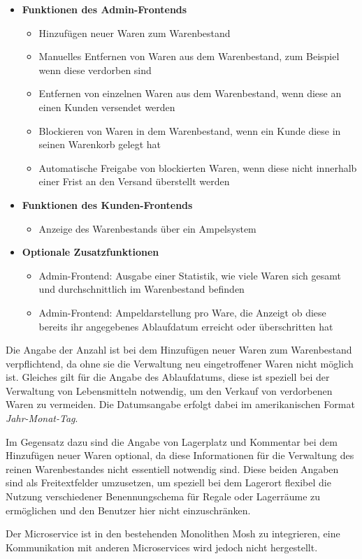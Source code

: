 \begin{itemize}
	\item \textbf{Funktionen des Admin-Frontends}
	\begin{itemize}
		\item Hinzufügen neuer Waren zum Warenbestand
		\item Manuelles Entfernen von Waren aus dem Warenbestand, zum Beispiel wenn diese verdorben sind
		\item Entfernen von einzelnen Waren aus dem Warenbestand, wenn diese an einen Kunden versendet werden
		\item Blockieren von Waren in dem Warenbestand, wenn ein Kunde diese in seinen Warenkorb gelegt hat
		\item Automatische Freigabe von blockierten Waren, wenn diese nicht innerhalb einer Frist an den Versand überstellt werden
	\end{itemize}
	\item \textbf{Funktionen des Kunden-Frontends}
	\begin{itemize}
		\item Anzeige des Warenbestands über ein Ampelsystem
	\end{itemize}
	\item \textbf{Optionale Zusatzfunktionen}
	\begin{itemize}
		\item Admin-Frontend: Ausgabe einer Statistik, wie viele Waren sich gesamt und durchschnittlich im Warenbestand befinden 
		\item Admin-Frontend: Ampeldarstellung pro Ware, die Anzeigt ob diese bereits ihr angegebenes Ablaufdatum erreicht oder überschritten hat
	\end{itemize}
\end{itemize}
\newpage
Die Angabe der Anzahl ist bei dem Hinzufügen neuer Waren zum Warenbestand verpflichtend, da ohne sie die Verwaltung neu eingetroffener Waren nicht möglich ist. Gleiches gilt für die Angabe des Ablaufdatums, diese ist speziell bei der Verwaltung von Lebensmitteln notwendig, um den Verkauf von verdorbenen Waren zu vermeiden. Die Datumsangabe erfolgt dabei im amerikanischen Format \textit{Jahr-Monat-Tag}. \par 
Im Gegensatz dazu sind die Angabe von Lagerplatz und Kommentar bei dem Hinzufügen neuer Waren optional, da diese Informationen für die Verwaltung des reinen Warenbestandes nicht essentiell notwendig sind. Diese beiden Angaben sind als Freitextfelder umzusetzen, um speziell bei dem Lagerort flexibel die Nutzung verschiedener Benennungschema für Regale oder Lagerräume zu ermöglichen und den Benutzer hier nicht einzuschränken. \par 
Der Microservice ist in den bestehenden Monolithen Mosh zu integrieren, eine Kommunikation mit anderen Microservices wird jedoch nicht hergestellt.